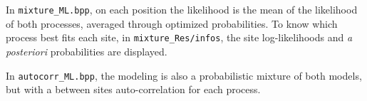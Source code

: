 \documentclass{article}
\begin{document}
In \verb#mixture_ML.bpp#, on each position the likelihood is the mean
of the likelihood of both processes, averaged through optimized
probabilities. To know which process best fits each site, in
\verb#mixture_Res/infos#, the site log-likelihoods and \textit{a
  posteriori} probabilities are displayed.

In \verb#autocorr_ML.bpp#, the modeling is also a probabilistic
mixture of both models, but with a between sites auto-correlation for
each process.




\end{document}
